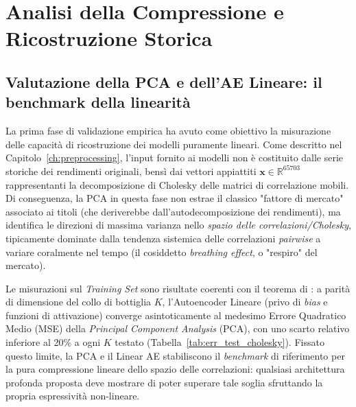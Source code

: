 \chapter{Analisi della Compressione e Ricostruzione Storica}
\label{ch:analisi_compressione}
\section{Valutazione della PCA e dell'AE Lineare: il benchmark della linearità}
\label{sec:risultati_pca_linear}

La prima fase di validazione empirica ha avuto come obiettivo la misurazione delle capacità di ricostruzione dei modelli puramente lineari. Come descritto nel Capitolo~\ref{ch:preprocessing}, l'input fornito ai modelli non è costituito dalle serie storiche dei rendimenti originali, bensì dai vettori appiattiti $\mathbf{x} \in \mathbb{R}^{65703}$ rappresentanti la decomposizione di Cholesky delle matrici di correlazione mobili. Di conseguenza, la PCA in questa fase non estrae il classico "fattore di mercato" associato ai titoli (che deriverebbe dall'autodecomposizione dei rendimenti), ma identifica le direzioni di massima varianza nello \emph{spazio delle correlazioni/Cholesky}, tipicamente dominate dalla tendenza sistemica delle correlazioni \emph{pairwise} a variare coralmente nel tempo (il cosiddetto \emph{breathing effect}, o "respiro" del mercato).

Le misurazioni sul \emph{Training Set} sono risultate coerenti con il teorema di \citet{bourlard1988autoassociation}: a parità di dimensione del collo di bottiglia $K$, l'Autoencoder Lineare (privo di \emph{bias} e funzioni di attivazione) converge asintoticamente al medesimo Errore Quadratico Medio (MSE) della \emph{Principal Component Analysis} (PCA), con uno scarto relativo inferiore al 20\% a ogni $K$ testato (Tabella~\ref{tab:err_test_cholesky}). Fissato questo limite, la PCA e il Linear AE stabiliscono il \emph{benchmark} di riferimento per la pura compressione lineare dello spazio delle correlazioni: qualsiasi architettura profonda proposta deve mostrare di poter superare tale soglia sfruttando la propria espressività non-lineare.

